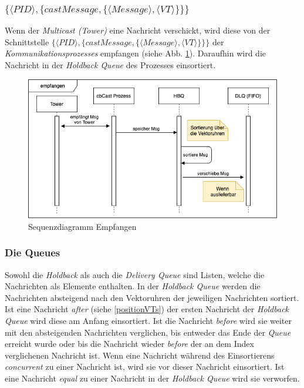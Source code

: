 \subsubsection{$\{\langle PID \rangle,\{castMessage,\{\langle Message \rangle, \langle VT \rangle\}\}\}$}

Wenn der \textit{Multicast (Tower)} eine Nachricht verschickt, wird diese von der Schnittstelle $\{\langle PID \rangle,\{castMessage,\{\langle Message \rangle, \langle VT \rangle\}\}\}$ der \textit{Kommunikationsprozesses} empfangen (siehe Abb. \ref{fig:sequence_cbCast_cbcast}). Daraufhin wird die Nachricht in der \textit{Holdback Queue} des Prozesses einsortiert.

\begin{figure}[htbp]
\begin{center}
\includegraphics[scale=0.5]{Latex/Bilder/Sequenz_empfangen.png}
\caption{\label{fig:sequence_cbCast_cbcast} Sequenzdiagramm Empfangen}
\end{center}
\end{figure}

\subsubsection{Die Queues}

Sowohl die \textit{Holdback} als auch die \textit{Delivery Queue} sind Listen, welche die Nachrichten als Elemente enthalten. In der \textit{Holdback Queue} werden die Nachrichten absteigend nach den Vektoruhren der jeweiligen Nachrichten sortiert. Ist eine Nachricht \textit{after} (siehe \ref{positionVTs}) der ersten Nachricht der \textit{Holdback Queue} wird diese am Anfang einsortiert. Ist die Nachricht \textit{before} wird sie weiter mit den absteigenden Nachrichten verglichen, bis entweder das Ende der \textit{Queue} erreicht wurde oder bis die Nachricht wieder \textit{before} der an dem Index verglichenen Nachricht ist. Wenn eine Nachricht während des Einsortierens \textit{concurrent} zu einer Nachricht ist, wird sie vor dieser Nachricht einsortiert. Ist eine Nachricht \textit{equal} zu einer Nachricht in der \textit{Holdback Queue} wird sie verworfen.


